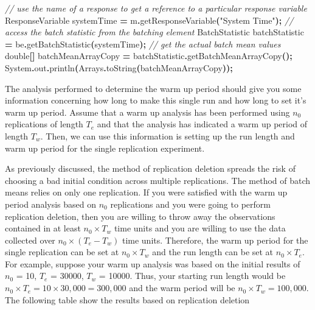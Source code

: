 \documentclass[
]{book}
\newenvironment{Shaded}{\begin{snugshade}}{\end{snugshade}}
\newcommand{\BuiltInTok}[1]{#1}
\newcommand{\CommentTok}[1]{\textcolor[rgb]{0.56,0.35,0.01}{\textit{#1}}}
\newcommand{\DataTypeTok}[1]{\textcolor[rgb]{0.13,0.29,0.53}{#1}}
\newcommand{\FunctionTok}[1]{\textcolor[rgb]{0.00,0.00,0.00}{#1}}
\newcommand{\NormalTok}[1]{#1}
\newcommand{\OperatorTok}[1]{\textcolor[rgb]{0.81,0.36,0.00}{\textbf{#1}}}
\newcommand{\StringTok}[1]{\textcolor[rgb]{0.31,0.60,0.02}{#1}}
\theoremstyle{definition}
\theoremstyle{definition}
\theoremstyle{definition}
\theoremstyle{definition}
\theoremstyle{remark}
\begin{document}
\begin{Shaded}
\begin{Highlighting}[]
\CommentTok{// use the name of a response to get a reference to a particular response variable}
\NormalTok{ResponseVariable systemTime }\OperatorTok{=}\NormalTok{ m}\OperatorTok{.}\FunctionTok{getResponseVariable}\OperatorTok{(}\StringTok{"System Time"}\OperatorTok{);}
\CommentTok{// access the batch statistic from the batching element}
\NormalTok{BatchStatistic batchStatistic }\OperatorTok{=}\NormalTok{ be}\OperatorTok{.}\FunctionTok{getBatchStatistic}\OperatorTok{(}\NormalTok{systemTime}\OperatorTok{);}
\CommentTok{// get the actual batch mean values}
\DataTypeTok{double}\OperatorTok{[]}\NormalTok{ batchMeanArrayCopy }\OperatorTok{=}\NormalTok{ batchStatistic}\OperatorTok{.}\FunctionTok{getBatchMeanArrayCopy}\OperatorTok{();}
\BuiltInTok{System}\OperatorTok{.}\FunctionTok{out}\OperatorTok{.}\FunctionTok{println}\OperatorTok{(}\BuiltInTok{Arrays}\OperatorTok{.}\FunctionTok{toString}\OperatorTok{(}\NormalTok{batchMeanArrayCopy}\OperatorTok{));}
\end{Highlighting}
\end{Shaded}

The analysis performed to determine the warm up period should give you
some information concerning how long to make this single run and how
long to set it's warm up period. Assume that a warm up analysis has been
performed using \(n_0\) replications of length \(T_e\) and that the analysis
has indicated a warm up period of length \(T_w\). Then, we can use this
information is setting up the run length and warm up period for the
single replication experiment.

As previously discussed, the method of replication deletion spreads the
risk of choosing a bad initial condition across multiple replications.
The method of batch means relies on only one replication. If you were
satisfied with the warm up period analysis based on \(n_0\) replications
and you were going to perform replication deletion, then you are willing
to throw away the observations contained in at least \(n_0 \times T_w\)
time units and you are willing to use the data collected over
\(n_0 \times (T_e - T_w)\) time units. Therefore, the warm up period for
the single replication can be set at \(n_0 \times T_w\) and the run length
can be set at \(n_0 \times T_e\). For example, suppose your warm up
analysis was based on the initial results of \(n_0\) = 10, \(T_e\) = 30000,
\(T_w\) = 10000. Thus, your starting run length would be
\(n_0 \times T_e = 10 \times 30,000 = 300,000\) and the warm period will
be \(n_0 \times T_w = 100,000\). The following table show the results based on replication deletion
\end{document}

